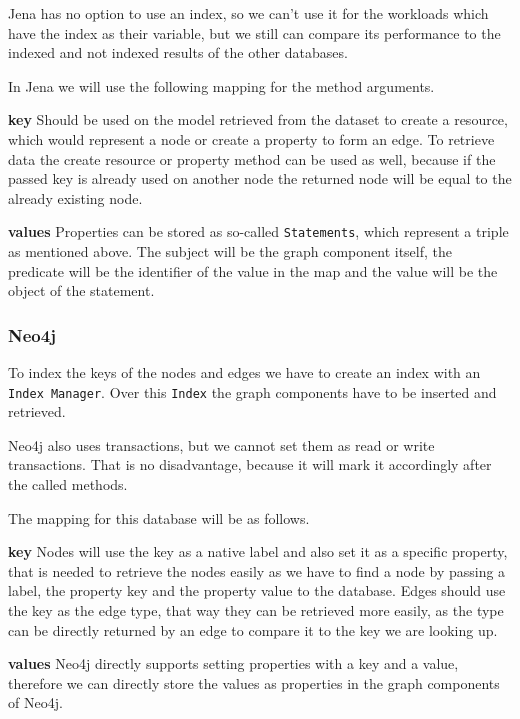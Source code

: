 Jena has no option to use an index,
so we can't use it for the workloads which have the index as their variable,
but we still can compare its performance to the indexed and not indexed results of the other databases.

In Jena we will use the following mapping for the method arguments.

\textbf{key} \newline
Should be used on the model retrieved from the dataset to create a resource,
which would represent a node or create a property to form an edge.
To retrieve data the create resource or property method can be used as well,
because if the passed key is already used on another node the returned node will be equal to the already existing node.

\textbf{values} \newline
Properties can be stored as so-called \texttt{Statements},
which represent a triple as mentioned above.
The subject will be the graph component itself,
the predicate will be the identifier of the value in the map and the value will be the object of the statement.

\subsubsection{Neo4j}
To index the keys of the nodes and edges we have to create an index with an \texttt{Index Manager}.
Over this \texttt{Index} the graph components have to be inserted and retrieved.

Neo4j also uses transactions,
but we cannot set them as read or write transactions.
That is no disadvantage,
because it will mark it accordingly after the called methods.

The mapping for this database will be as follows.

\textbf{key} \newline
Nodes will use the key as a native label and also set it as a specific property,
that is needed to retrieve the nodes easily as we have to find a node by passing a label, the property key and the property value to the database.
Edges should use the key as the edge type,
that way they can be retrieved more easily,
as the type can be directly returned by an edge to compare it to the key we are looking up.

\textbf{values} \newline
Neo4j directly supports setting properties with a key and a value,
therefore we can directly store the values as properties in the graph components of Neo4j.

